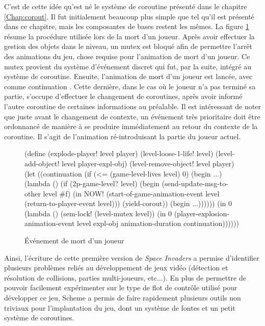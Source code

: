 \documentclass[12pt,oneside,letterpaper,francais]{book}
\newcommand{\si}{{\textit{Space Invaders }}}
\newcommand{\scheme}[1]{\selectlanguage{english}{\tt #1}\selectlanguage{french}}
\begin{document}
C'est de cette idée qu'est né le système de coroutine présenté dans le
chapitre \ref{Chap:corout}. Il fut initialement beaucoup plus simple
que tel qu'il est présenté dans ce chapitre, mais les composantes de
bases restent les mêmes. La figure \ref{Exp:si-mort} résume la
procédure utilisée lors de la mort d'un joueur. Après avoir effectuer
la gestion des objets dans le niveau, un mutex est bloqué afin de
permettre l'arrêt des animations du jeu, chose requise pour
l'animation de mort d'un joueur. Ce mutex provient du système
d'événement discret qui fut, par la suite, intégré au système de
coroutine. Ensuite, l'animation de mort d'un joueur est lancée, avec
comme continuation \scheme{continuation}. Cette dernière, dans le cas
où le joueur n'a pas terminé sa partie, s'occupe d'effectuer le
changement de coroutines, après avoir informé l'autre coroutine de
certaines informations au préalable. Il est intéressant de noter que
juste avant le changement de contexte, un événement très prioritaire
doit être ordonnancé de manière à se produire immédiatement au retour
du contexte de la coroutine. Il s'agit de l'animation ré-introduisant
la partie du joueur actuel.

\begin{figure}[htb!]
  \begin{schemecode}
(define (explode-player! level player)
  (level-loose-1-life! level)
  (level-add-object! level player-expl-obj)
  (level-remove-object! level player)
  (let ((continuation
         (if (<= (game-level-lives level) 0)
             (begin ...)
             (lambda ()
               (if (2p-game-level? level)
                   (begin
                     (send-update-msg-to-other level \#f)
                     (in NOW! (start-of-game-animation-event
                               level (return-to-player-event level)))
                     (yield-corout))
                   (begin ...))))))
     (in 0 (lambda ()
            (sem-lock! (level-mutex level))
            (in 0 (player-explosion-animation-event
                   level expl-obj animation-duration continuation))))))
   \end{schemecode}
  \caption{Événement de mort d'un joueur}
  \label{Exp:si-mort}
\end{figure}

Ainsi, l'écriture de cette première version de \si a permise
d'identifier plusieurs problèmes reliés au développement de jeux vidéo
(détection et résolution de collisions, parties multi-joueurs,
etc...). En plus de permettre de pouvoir facilement expérimenter sur
le type de flot de contrôle utilisé pour développer ce jeu, Scheme a
permis de faire rapidement plusieurs outils non triviaux pour
l'implantation du jeu, dont un système de fontes et un petit système
de coroutines.
\end{document}
